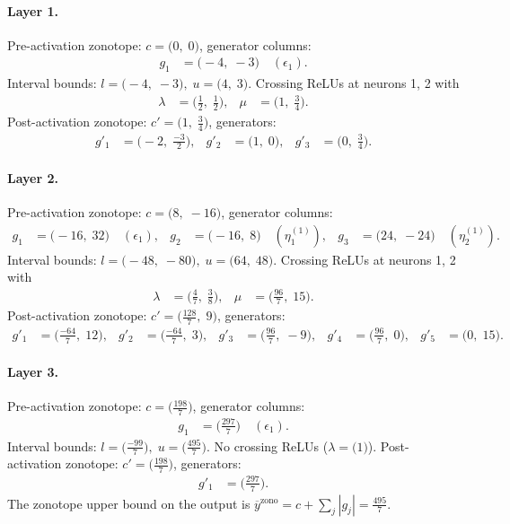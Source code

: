 \documentclass[11pt]{article}
\begin{document}
\paragraph{Layer 1.}
Pre-activation zonotope: $c = \bigl(0,\; 0\bigr)$, generator columns:
\begin{align*}
g_{1} &= \bigl(-4,\; -3\bigr) \quad (\epsilon_{1}).
\end{align*}
Interval bounds: $l = \bigl(-4,\; -3\bigr), \; u = \bigl(4,\; 3\bigr)$. 
Crossing ReLUs at neurons 1, 2 with
\begin{align*}
\lambda &= \bigl(\frac{1}{2},\; \frac{1}{2}\bigr), & \mu &= \bigl(1,\; \frac{3}{4}\bigr).
\end{align*}
Post-activation zonotope: $c' = \bigl(1,\; \frac{3}{4}\bigr)$, generators:
\begin{align*}
g'_{1} &= \bigl(-2,\; \frac{-3}{2}\bigr), &
g'_{2} &= \bigl(1,\; 0\bigr), &
g'_{3} &= \bigl(0,\; \frac{3}{4}\bigr).
\end{align*}
\paragraph{Layer 2.}
Pre-activation zonotope: $c = \bigl(8,\; -16\bigr)$, generator columns:
\begin{align*}
g_{1} &= \bigl(-16,\; 32\bigr) \quad (\epsilon_{1}), &
g_{2} &= \bigl(-16,\; 8\bigr) \quad (\eta^{(1)}_{1}), &
g_{3} &= \bigl(24,\; -24\bigr) \quad (\eta^{(1)}_{2}).
\end{align*}
Interval bounds: $l = \bigl(-48,\; -80\bigr), \; u = \bigl(64,\; 48\bigr)$. 
Crossing ReLUs at neurons 1, 2 with
\begin{align*}
\lambda &= \bigl(\frac{4}{7},\; \frac{3}{8}\bigr), & \mu &= \bigl(\frac{96}{7},\; 15\bigr).
\end{align*}
Post-activation zonotope: $c' = \bigl(\frac{128}{7},\; 9\bigr)$, generators:
\begin{align*}
g'_{1} &= \bigl(\frac{-64}{7},\; 12\bigr), &
g'_{2} &= \bigl(\frac{-64}{7},\; 3\bigr), &
g'_{3} &= \bigl(\frac{96}{7},\; -9\bigr), &
g'_{4} &= \bigl(\frac{96}{7},\; 0\bigr), &
g'_{5} &= \bigl(0,\; 15\bigr).
\end{align*}
\paragraph{Layer 3.}
Pre-activation zonotope: $c = \bigl(\frac{198}{7}\bigr)$, generator columns:
\begin{align*}
g_{1} &= \bigl(\frac{297}{7}\bigr) \quad (\epsilon_{1}).
\end{align*}
Interval bounds: $l = \bigl(\frac{-99}{7}\bigr), \; u = \bigl(\frac{495}{7}\bigr)$. 
No crossing ReLUs ($\lambda = \bigl(1\bigr)$).
Post-activation zonotope: $c' = \bigl(\frac{198}{7}\bigr)$, generators:
\begin{align*}
g'_{1} &= \bigl(\frac{297}{7}\bigr).
\end{align*}
The zonotope upper bound on the output is $\overline{y}^{\text{zono}} = c + \sum_j |g_j| = \frac{495}{7}$.
\end{document}
